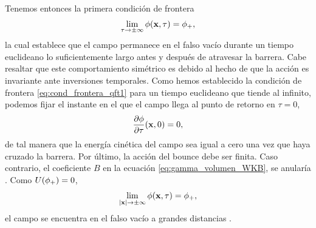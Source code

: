 Tenemos entonces la primera condición de frontera 
\begin{equation} \label{eq:cond_frontera_qft1}
\lim_{\tau \rightarrow \pm\infty} \phi\qty(\vb{x}, \tau) = \phi_+,
\end{equation}
la cual establece que el
campo permanece en el falso vacío durante un tiempo euclideano lo suficientemente largo antes y después de atravesar la barrera. Cabe resaltar que este comportamiento simétrico es debido al hecho de que la acción es invariante ante inversiones temporales. Como hemos establecido la condición de frontera \eqref{eq:cond_frontera_qft1} para un tiempo euclideano que tiende al infinito, 
podemos fijar el instante en el que el campo llega al punto de retorno en $\tau = 0$,
\begin{equation} \label{eq:cond_frontera_qft2}
\pdv{\phi}{\tau}\qty(\vb{x}, 0) = 0,
\end{equation}
de tal manera que la energía cinética del campo sea igual a cero una vez que haya cruzado la barrera. 
Por último, la acción del bounce debe ser finita. Caso contrario, el coeficiente $B$ en la ecuación \eqref{eq:gamma_volumen_WKB}, se anularía \cite{lee2005fate}. Como $U\qty(\phi_+) = 0$,
\begin{equation} \label{eq:cond_frontera_qft3}
\lim_{\qty|\vb{x}| \rightarrow \pm\infty} \phi\qty(\vb{x}, \tau) = \phi_+,
\end{equation}
el campo se encuentra en el falso vacío a grandes distancias \cite{Masoumi:2015psa}. %

